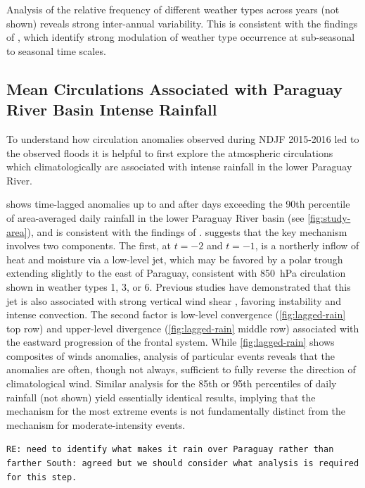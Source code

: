\documentclass{ametsoc}
\begin{document}
Analysis of the relative frequency of different weather types across years (not shown) reveals strong inter-annual variability.
This is consistent with the findings of \citet{Munoz2015,Munoz2016}, which identify strong modulation of weather type occurrence at sub-seasonal to seasonal time scales.

\subsection{Mean Circulations Associated with Paraguay River Basin Intense Rainfall} \label{sec:rainfall-circulation}

To understand how circulation anomalies observed during NDJF 2015-2016 led to the observed floods it is helpful to first explore the atmospheric circulations which climatologically are associated with intense rainfall in the lower Paraguay River.

 shows time-lagged anomalies up to and after days exceeding the 90th percentile of area-averaged daily rainfall in the lower Paraguay River basin (see \cref{fig:study-area}), and is consistent with the findings of \citet{Marengo2004,Salio:2007gd}.
 suggests that the key mechanism involves two components.
The first, at $t=-2$ and $t=-1$, is a northerly inflow of heat and moisture via a low-level jet, which may be favored by a polar trough extending slightly to the east of Paraguay, consistent with \SI{850}{\hecto\pascal} circulation shown in weather types 1, 3, or 6.
Previous studies have demonstrated that this jet is also associated with strong vertical wind shear \citep{Marengo2004,Silva2009}, favoring instability and intense convection.
The second factor is low-level convergence (\cref{fig:lagged-rain} top row) and upper-level divergence (\cref{fig:lagged-rain} middle row) associated with the eastward progression of the frontal system.
While \cref{fig:lagged-rain} shows composites of winds anomalies, analysis of particular events reveals that the anomalies are often, though not always, sufficient to fully reverse the direction of climatological wind.
Similar analysis for the 85th or 95th percentiles of daily rainfall (not shown) yield essentially identical results, implying that the mechanism for the most extreme events is not fundamentally distinct from the mechanism for moderate-intensity events.

\texttt{RE: need to identify what makes it rain over Paraguay rather than farther South: agreed but we should consider what analysis is required for this step.}
\end{document}
